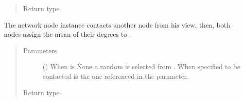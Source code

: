\documentclass[letterpaper,10pt,english]{sphinxmanual}
\begin{document}
\begin{fulllineitems}
\begin{fulllineitems}
\begin{quote}
\begin{description}
\item[{Return type}] \leavevmode
{}

\end{description}\end{quote}

\end{fulllineitems}


\begin{fulllineitems}
\label{\detokenize{app.domain:app.domain.network_nodes.NewscastNode.aggregate}}
The network node instance contacts another node from his view, then,
both nodes assign the mean of their degrees to
{\hyperref[\detokenize{app.domain:app.domain.network_nodes.NewscastNode.aggregation_value}]{}}.
\begin{quote}\begin{description}
\item[{Parameters}] \leavevmode
{} (\sphinxstyleliteralemphasis{\sphinxupquote{{[}}}{\hyperref[\detokenize{app.domain:app.domain.network_nodes.NewscastNode}]{\sphinxcrossref{\sphinxstyleliteralemphasis{\sphinxupquote{app.domain.network\_nodes.NewscastNode}}}}}\sphinxstyleliteralemphasis{\sphinxupquote{{]}}}) \textendash{} When  is None a random  is selected
from {\hyperref[\detokenize{app.domain:app.domain.network_nodes.NewscastNode.view}]{}}. When specified to be contacted is the
one referenced in the parameter.

\item[{Return type}] \leavevmode
{}

\end{description}\end{quote}

\end{fulllineitems}



\end{fulllineitems}
\end{document}
